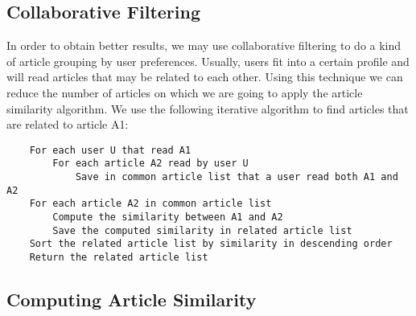 \subsection{Collaborative Filtering}
\label{sec:collaborative-filtering}
In order to obtain better results, we may use collaborative filtering to do a kind of article grouping by user preferences. Usually, users fit into a certain profile and will read articles that may be related to each other. Using this technique we can reduce the number of articles on which we are going to apply the article similarity algorithm. We use the following iterative algorithm\cite{item-to-item-recomm} to find articles that are related to article A1:
\lstset{language=make,caption=Item to item collaborative filtering,label=lst:app-make}
\begin{lstlisting}
	For each user U that read A1
		For each article A2 read by user U
			Save in common article list that a user read both A1 and A2
	For each article A2 in common article list
		Compute the similarity between A1 and A2
		Save the computed similarity in related article list
	Sort the related article list by similarity in descending order
	Return the related article list
\end{lstlisting}

\subsection{Computing Article Similarity}
\label{sec:computing-article-similarity}

